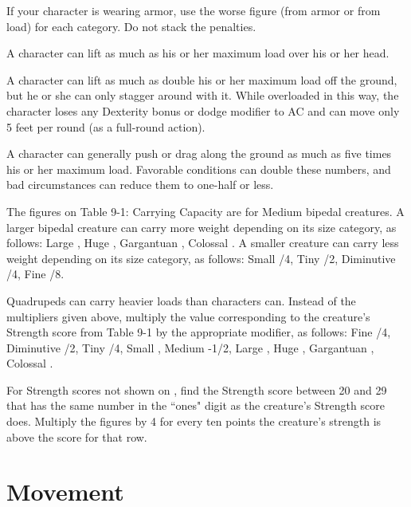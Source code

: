 If your character is wearing armor, use the worse figure (from armor or from load) for each category. Do not stack the penalties.

 A character can lift as much as his or her maximum load over his or her head.

A character can lift as much as double his or her maximum load off the ground, but he or she can only stagger around with it. While overloaded in this way, the character loses any Dexterity bonus or dodge modifier to AC and can move only 5 feet per round (as a full-round action).

A character can generally push or drag along the ground as much as five times his or her maximum load. Favorable conditions can double these numbers, and bad circumstances can reduce them to one-half or less.

 The figures on Table 9-1: Carrying Capacity are for Medium bipedal creatures. A larger bipedal creature can carry more weight depending on its size category, as follows: Large , Huge , Gargantuan , Colossal . A smaller creature can carry less weight depending on its size category, as follows: Small /4, Tiny /2, Diminutive /4, Fine /8.

Quadrupeds can carry heavier loads than characters can. Instead of the multipliers given above, multiply the value corresponding to the creature's Strength score from Table 9-1 by the appropriate modifier, as follows: Fine /4, Diminutive /2, Tiny /4, Small , Medium -1/2, Large , Huge , Gargantuan , Colossal .

 For Strength scores not shown on , find the Strength score between 20 and 29 that has the same number in the ``ones" digit as the creature's Strength score does. Multiply the figures by 4 for every ten points the creature's strength is above the score for that row.

\section{Movement}

